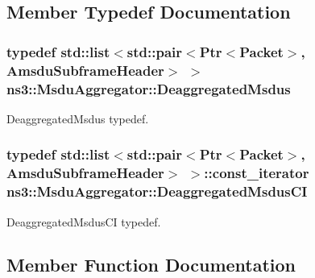 \subsection{Member Typedef Documentation}
\subsubsection[{\texorpdfstring{Deaggregated\+Msdus}{DeaggregatedMsdus}}]{\setlength{\rightskip}{0pt plus 5cm}typedef {\bf std\+::list}$<$std\+::pair$<${\bf Ptr}$<${\bf Packet}$>$, {\bf Amsdu\+Subframe\+Header}$>$ $>$ {\bf ns3\+::\+Msdu\+Aggregator\+::\+Deaggregated\+Msdus}}\hypertarget{classns3_1_1MsduAggregator_a9ca3d84483249fae3dffc35bcc98bb11}{}\label{classns3_1_1MsduAggregator_a9ca3d84483249fae3dffc35bcc98bb11}


Deaggregated\+Msdus typedef. 

\subsubsection[{\texorpdfstring{Deaggregated\+Msdus\+CI}{DeaggregatedMsdusCI}}]{\setlength{\rightskip}{0pt plus 5cm}typedef {\bf std\+::list}$<$std\+::pair$<${\bf Ptr}$<${\bf Packet}$>$, {\bf Amsdu\+Subframe\+Header}$>$ $>$\+::const\+\_\+iterator {\bf ns3\+::\+Msdu\+Aggregator\+::\+Deaggregated\+Msdus\+CI}}\hypertarget{classns3_1_1MsduAggregator_a6cc0e0e5681fa47009e6ff74d15f1656}{}\label{classns3_1_1MsduAggregator_a6cc0e0e5681fa47009e6ff74d15f1656}


Deaggregated\+Msdus\+CI typedef. 



\subsection{Member Function Documentation}
